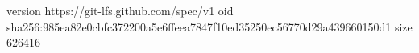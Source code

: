 version https://git-lfs.github.com/spec/v1
oid sha256:985ea82e0cbfc372200a5e6ffeea7847f10ed35250ec56770d29a439660150d1
size 626416
